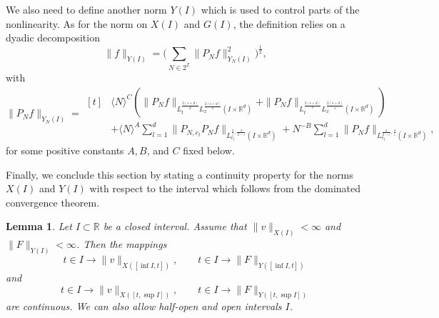 \documentclass[aihp]{imsart}
\numberwithin{equation}{section}
\theoremstyle{plain}
\newtheorem{lem}[thm]{Lemma}
\theoremstyle{remark}
\newcommand{\R}{\mathbb{R}}
\newcommand{\Z}{\mathbb{Z}}
\begin{document}
We also need to define another norm $Y(I)$ which is used to control parts of the nonlinearity. As for the norm on $X(I)$ and $G(I)$, the definition relies on a dyadic decomposition
$$\|f\|_{Y(I)} = \Big(\sum_{N\in 2^{\Z}}  \|P_N f\|_{Y_N(I)}^2\Big)^{\frac{1}{2}},$$
with
\begin{equation}\label{defyn}
\|P_N f\|_{Y_N(I)}= \begin{aligned}[t]
& \langle N\rangle^C \left(\|P_N f\|_{L_t^{\frac{2(s+d)}{d}} L_x^{\frac{2(s+d)}{s}} (I\times \R^d)} +\|P_N f\|_{L_t^{\frac{2(s+d)}{s}} L_x^{\frac{2(s+d)}{s}}(I\times \R^d) } \right)\\
&+\langle N\rangle^A \sum_{l=1}^d \|P_{N,e_l} P_N f \|_{L^{\frac{4}{\varepsilon},\frac{4}{2-\varepsilon}}_{e_l}(I\times \R^d) } +N^{-B} \sum_{l=1}^d \|P_N f\|_{L^{\frac{4}{2-\varepsilon},\frac{4}{\varepsilon}}_{e_l} (I\times \R^d) },  
\end{aligned}
\end{equation}
for some positive constants $A,B$, and $C$ fixed below.



Finally, we conclude this section by stating a continuity property for the norms $X(I)$ and $Y(I)$ with respect to the interval which follows from the dominated convergence theorem.

\begin{lem}
\label{lemcontt}
 Let $I\subset \R$ be a closed interval. Assume that $\|v\|_{X(I)}<\infty $  and $\|F\|_{Y(I)}<\infty$. Then the mappings
$$t\in I \rightarrow \|v\|_{X([\inf I,t])},\qquad t\in I \rightarrow \|F\|_{Y([\inf I,t])}$$
and
$$t\in I \rightarrow \|v\|_{X([t,\sup I])},\qquad t\in I \rightarrow \|F\|_{Y([t,\sup I])}$$
are continuous. We can also allow half-open and open intervals $I$.
\end{lem}
\end{document}
